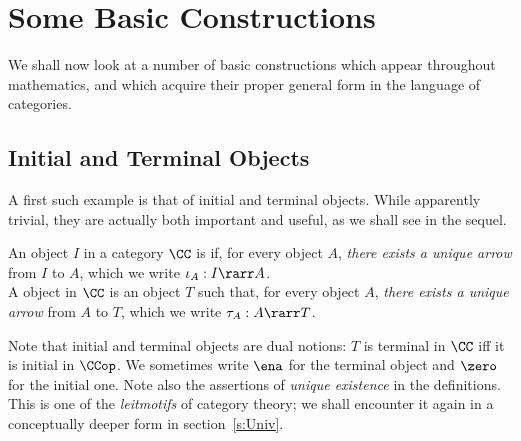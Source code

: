 \documentclass[12pt]{article}
\begin{document}
\section{Some Basic Constructions}\label{s:BasConstr}

We shall now look at a number of basic constructions which appear throughout mathematics, and which acquire their proper general form in the language of categories.

\subsection{Initial and Terminal Objects}

A first such example is that of initial and terminal objects. While apparently trivial, they are actually both important and useful, as we shall see in the sequel.

\begin{mydefinition}
An object $I$ in a category $\CC$ is  if, for every object $A$, \emph{there exists a unique arrow} from $I$ to $A$, which we write
$\iota_A : I \rarr A$. \\
A  object in $\CC$ is an object $T$ such that, for every object $A$, \emph{there exists a unique arrow} from $A$ to $T$, which we write $\tau_A: A \rarr T$.\deq
\end{mydefinition}
%
Note that initial and terminal objects are dual notions: $T$ is terminal in $\CC$ iff it is initial in $\CCop$. We sometimes write $\ena$ for the
terminal object and $\zero$ for the initial one.
%
Note also the assertions of \emph{unique existence} in the definitions. This is one of the \textit{leitmotifs} of category theory; we shall encounter it again in a conceptually deeper form in section~\ref{s:Univ}.
\end{document}
